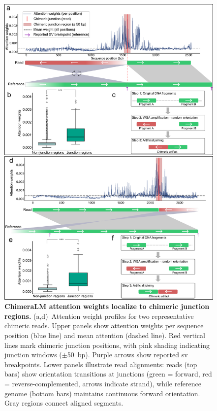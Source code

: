 \documentclass[pdflatex,sn-nature,lineno]{sn-jnl}%
\theoremstyle{thmstyleone}%
\theoremstyle{thmstyletwo}%
\theoremstyle{thmstylethree}%
\begin{document}
\begin{figure}[H]
	\begin{center}
		\includegraphics[width=\textwidth]{final_figures/figure4}
	\end{center}
	\caption{{\bf ChimeraLM attention weights localize to chimeric junction regions.}
		(a,d)~Attention weight profiles for two representative chimeric reads. Upper panels show attention weights per sequence position (blue line) and mean attention (dashed line). Red vertical lines mark chimeric junction positions, with pink shading indicating junction windows ($\pm$50~bp). Purple arrows show reported \gls{sv} breakpoints. Lower panels illustrate read alignments: reads (top bars) show orientation transitions at junctions (green = forward, red = reverse-complemented, arrows indicate strand), while reference genome (bottom bars) maintains continuous forward orientation. Gray regions connect aligned segments.
}
\end{figure}
\end{document}
